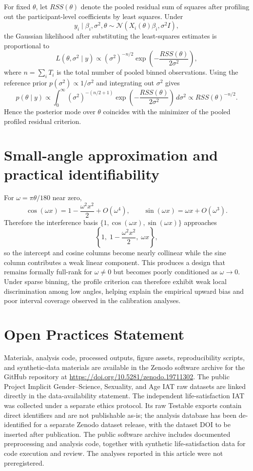 \documentclass[12pt]{article}
\begin{document}
For fixed $\theta$, let $RSS(\theta)$ denote the pooled residual sum of squares after profiling out the participant-level coefficients by least squares. Under
\[
y_i \mid \beta_i,\sigma^2,\theta \sim \mathcal{N}(X_i(\theta)\beta_i,\sigma^2 I),
\]
the Gaussian likelihood after substituting the least-squares estimates is proportional to
\[
L(\theta,\sigma^2 \mid y)\propto (\sigma^2)^{-n/2}\exp\!\left(-\frac{RSS(\theta)}{2\sigma^2}\right),
\]
where $n=\sum_i T_i$ is the total number of pooled binned observations. Using the reference prior $p(\sigma^2)\propto 1/\sigma^2$ and integrating out $\sigma^2$ gives
\[
p(\theta \mid y)\propto \int_0^\infty (\sigma^2)^{-(n/2+1)}
\exp\!\left(-\frac{RSS(\theta)}{2\sigma^2}\right)\, d\sigma^2
\propto RSS(\theta)^{-n/2}.
\]
Hence the posterior mode over $\theta$ coincides with the minimizer of the pooled profiled residual criterion.

\section{Small-angle approximation and practical identifiability}

For $\omega=\pi\theta/180$ near zero,
\[
\cos(\omega x)=1-\frac{\omega^2x^2}{2}+O(\omega^4),\qquad
\sin(\omega x)=\omega x+O(\omega^3).
\]
Therefore the interference basis $\{1,\cos(\omega x),\sin(\omega x)\}$ approaches
\[
\left\{1,\;1-\frac{\omega^2x^2}{2},\;\omega x\right\},
\]
so the intercept and cosine columns become nearly collinear while the sine column contributes a weak linear component. This produces a design that remains formally full-rank for $\omega\neq 0$ but becomes poorly conditioned as $\omega\to 0$. Under sparse binning, the profile criterion can therefore exhibit weak local discrimination among low angles, helping explain the empirical upward bias and poor interval coverage observed in the calibration analyses.

\section*{Open Practices Statement}

Materials, analysis code, processed outputs, figure assets, reproducibility scripts, and synthetic-data materials are available in the Zenodo software archive for the GitHub repository at \url{https://doi.org/10.5281/zenodo.19711302}. The public Project Implicit Gender--Science, Sexuality, and Age IAT raw datasets are linked directly in the data-availability statement. The independent life-satisfaction IAT was collected under a separate ethics protocol. Its raw Testable exports contain direct identifiers and are not publishable as-is; the analysis database has been de-identified for a separate Zenodo dataset release, with the dataset DOI to be inserted after publication. The public software archive includes documented preprocessing and analysis code, together with synthetic life-satisfaction data for code execution and review. The analyses reported in this article were not preregistered.



\end{document}
